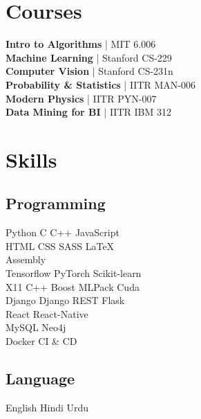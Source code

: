 \documentclass[]{durgesh_resume}
\begin{document}
\begin{minipage}[t]{0.33\textwidth}

\section{Courses}
{\bf Intro to Algorithms} | {\scriptsize MIT 6.006} \\
{\bf Machine Learning} | {\scriptsize Stanford CS-229} \\
{\bf Computer Vision} | {\scriptsize Stanford CS-231n} \\
{\bf Probability \& Statistics} | {\scriptsize IITR MAN-006} \\
{\bf Modern Physics} | {\scriptsize IITR PYN-007} \\
{\bf Data Mining for BI} | {\scriptsize IITR IBM 312}


\section{Skills}
\subsection{Programming}
Python \textbullet{} C \textbullet{} C++ \textbullet{}  JavaScript \\
HTML \textbullet{} CSS \textbullet{} SASS \textbullet{} \LaTeX  \\
Assembly \\
Tensorflow \textbullet{} PyTorch \textbullet{} Scikit-learn \\
X11 \textbullet{} C++ Boost \textbullet{} MLPack \textbullet{} Cuda \\
Django \textbullet{} Django REST \textbullet{} Flask\\
React \textbullet{} React-Native \\
MySQL \textbullet{} Neo4j \\
Docker \textbullet{} CI \& CD\\
\subsection{Language}
English \textbullet{} Hindi \textbullet{} Urdu\\
\sectionsep

%
%

\end{minipage} 
\end{document}
